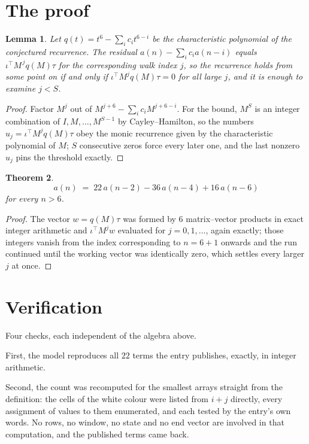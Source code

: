 \documentclass[11pt,a4paper]{article}
\theoremstyle{plain}
\newtheorem{theorem}{Theorem}
\newtheorem{lemma}[theorem]{Lemma}
\theoremstyle{definition}
\begin{document}
\section{The proof}

\begin{lemma}\label{lem:crit}
Let $q(t)=t^{6}-\sum_i c_it^{6-i}$ be the characteristic polynomial of the
conjectured recurrence. The residual $a(n)-\sum_ic_ia(n-i)$ equals
$\iota^{\!\top}M^{\,j}q(M)\tau$ for the corresponding walk index $j$, so the recurrence
holds from some point on if and only if $\iota^{\!\top}M^{j}q(M)\tau=0$ for all large $j$,
and it is enough to examine $j<S$.
\end{lemma}

\begin{proof}
Factor $M^{j}$ out of $M^{j+6}-\sum_ic_iM^{j+6-i}$. For the bound, $M^{S}$
is an integer combination of $I,M,\dots,M^{S-1}$ by Cayley--Hamilton, so the numbers
$u_j=\iota^{\!\top}M^{j}q(M)\tau$ obey the monic recurrence given by the characteristic
polynomial of $M$; $S$ consecutive zeros force every later one, and the last nonzero $u_j$
pins the threshold exactly.
\end{proof}

\begin{theorem}
\[
a(n)\;=\;22\,a(n-2) - 36\,a(n-4) + 16\,a(n-6)
\]
for every $n>6$.
\end{theorem}

\begin{proof}
The vector $w=q(M)\tau$ was formed by $6$ matrix--vector products in exact integer
arithmetic and $\iota^{\!\top}M^{j}w$ evaluated for $j=0,1,\dots$, again exactly; those
integers vanish from the index corresponding to $n=6+1$ onwards and the run continued
until the working vector was identically zero, which settles every larger $j$ at once.
\end{proof}

\section{Verification}

Four checks, each independent of the algebra above.

First, the model reproduces all $22$ terms the entry publishes, exactly, in integer
arithmetic.

Second, the count was recomputed for the smallest arrays straight from the definition: the cells
of the white colour were listed from $i+j$ directly, every assignment of values to them
enumerated, and each tested by the entry's own words. No rows, no window, no state and no end
vector are involved in that computation, and the published terms came back.
\end{document}
